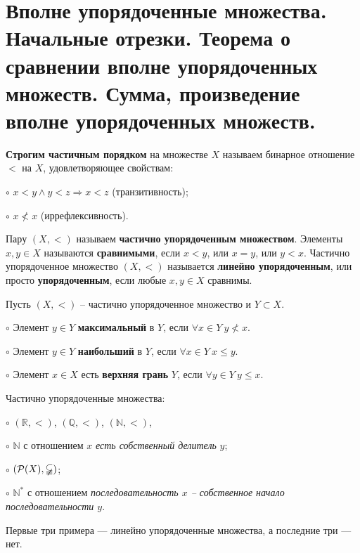 \section{Вполне упорядоченные множества. Начальные отрезки. Теорема о сравнении вполне упорядоченных множеств. Сумма, произведение вполне упорядоченных множеств.}

\begin{definition}
\textbf{Строгим частичным порядком} на множестве $X$ называем бинарное отношение $<$ на $X$, удовлетворяющее свойствам:

$\circ$ $x < y \land y<z \Rightarrow x<z$ (транзитивность);

$\circ$ $x \not< x$ (иррефлексивность).

Пару $(X, <)$ называем \textbf{частично упорядоченным множеством}. Элементы $x, y \in X$ называются \textbf{сравнимыми}, если $x < y$, или $x = y$, или $y < x$. Частично упорядоченное множество $(X, <)$ называется \textbf{линейно упорядоченным}, или просто \textbf{упорядоченным}, если любые $x, y \in X$ сравнимы.

Пусть $(X, <)$ -- частично упорядоченное множество и $Y \subset X$. 

$\circ$ Элемент $y \in Y$ \textbf{максимальный} в $Y$, если $\forall x \in Y \ y \not< x$.

$\circ$ Элемент $y \in Y$ \textbf{наибольший} в $Y$, если $\forall x \in Y \ x \leqslant y$.

$\circ$ Элемент $x \in X$ есть \textbf{верхняя грань} $Y$, если $\forall y \in Y \ y \leqslant x$.
\end{definition}

\begin{example}
Частично упорядоченные множества:

$\circ$ $(\mathbb{R}, <)$, $(\mathbb{Q}, <)$, $(\mathbb{N}, <)$,

$\circ$ $\mathbb{N}$ с отношением $x$ \textit{есть собственный делитель} $y$;

$\circ$ $(\mathcal{P}(X), \varsubsetneqq)$;

$\circ$ $\mathbb{N}^{*}$ с отношением \textit{последовательность $x$ -- собственное начало последовательности $y$}.

Первые три примера — линейно упорядоченные множества, а последние три — нет.
\end{example}

